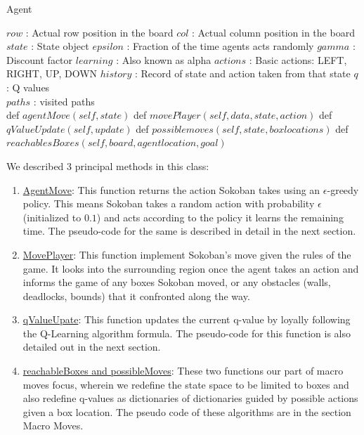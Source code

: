 \documentclass{article}
\begin{document}
\begin{algorithm}
\caption{Agent}
\begin{algorithmic}
  \State $row$ : Actual row position in the board
  \State $col$ : Actual column position in the board
  \State $state$ : State object
  \State $epsilon$ : Fraction of the time agents acts randomly
  \State $gamma$ : Discount factor
  \State $learning$ : Also known as alpha
  \State $actions$ : Basic actions: LEFT, RIGHT, UP, DOWN
  \State $history$ : Record of state and action taken from that state
  \State $q$ : Q values \\
  \State $paths$ : visited paths \\

  \State def $agentMove(self, state)$
  \State def $movePlayer(self, data, state, action)$
  \State def $qValueUpdate(self, update)$
  \State def $possiblemoves(self, state, box locations)$
  \State def $reachablesBoxes(self, board, agent location, goal)$
  
\EndStruct
\end{algorithmic}
\label{Class}
\end{algorithm}

We described 3 principal methods in this class:
    
\begin{enumerate}[label=\alph*)]
    \item \underline{AgentMove}: This function returns the action Sokoban takes using an $\epsilon$-greedy policy. This means Sokoban takes a random action with probability $\epsilon$ (initialized to $0.1$) and acts according to the policy it learns the remaining time. The pseudo-code for the same is described in detail in the next section.
    \item \underline{MovePlayer}: This function implement Sokoban's move given the rules of the game. It looks into the surrounding region once the agent takes an action and informs the game of any boxes Sokoban moved, or any obstacles (walls, deadlocks, bounds) that it confronted along the way. 
    \item \underline{qValueUpate}: This function updates the current q-value by loyally following the Q-Learning algorithm formula. The pseudo-code for this function is also detailed out in the next section. 
    \item \underline{reachableBoxes and possibleMoves}: These two functions our part of macro moves focus, wherein we redefine the state space to be limited to boxes and also redefine q-values as dictionaries of dictionaries guided by possible actions given a box location. The pseudo code of these algorithms are in the section Macro Moves. 
\end{enumerate}
\end{document}
